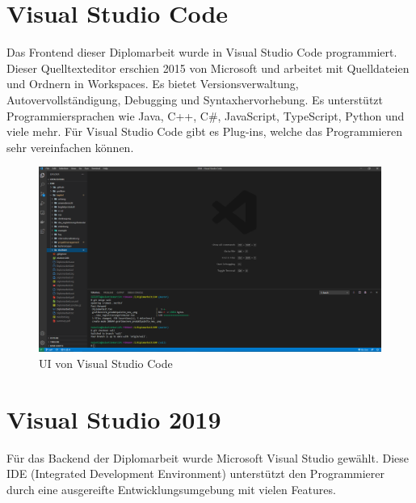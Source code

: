 \section{Visual Studio Code}
Das Frontend dieser Diplomarbeit wurde in Visual Studio Code programmiert. Dieser Quelltexteditor erschien 2015 von Microsoft und arbeitet mit Quelldateien und Ordnern in Workspaces. Es bietet Versionsverwaltung, Autovervollständigung, Debugging und Syntaxhervorhebung. Es unterstützt Programmiersprachen wie Java, C++, C\#, JavaScript, TypeScript, Python und viele mehr. Für Visual Studio Code gibt es Plug-ins, welche das Programmieren sehr vereinfachen können. \autocite{wikiVisualStudioCode}

\begin{figure}[H]
	\centerline{
		\includegraphics[width=1\textwidth, frame]{./grafiken/vs_code_startbildschirm.PNG}
	}
	\vskip0pt
	\caption{UI von Visual Studio Code} \label{fig:visualStudioCodeStartview}
\end{figure}

\section{Visual Studio 2019}

Für das Backend der Diplomarbeit wurde Microsoft Visual Studio gewählt. Diese IDE (Integrated Development Environment) unterstützt den Programmierer durch eine ausgereifte Entwicklungsumgebung mit vielen Features.\\

